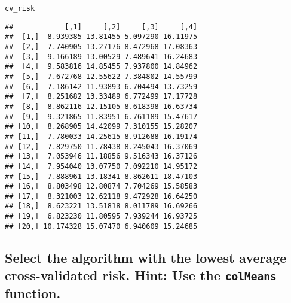\documentclass{article}\usepackage[]{graphicx}\usepackage[]{xcolor}
\makeatletter
\newcommand{\hlstd}[1]{\textcolor[rgb]{0.345,0.345,0.345}{#1}}%
\newenvironment{kframe}{%
 \def\at@end@of@kframe{}%
 \ifinner\ifhmode%
  \def\at@end@of@kframe{\end{minipage}}%
  \begin{minipage}{\columnwidth}%
 \fi\fi%
 \def\FrameCommand##1{\hskip\@totalleftmargin \hskip-\fboxsep
 \colorbox{shadecolor}{##1}\hskip-\fboxsep
     \hskip-\linewidth \hskip-\@totalleftmargin \hskip\columnwidth}%
 \MakeFramed {\advance\hsize-\width
   \@totalleftmargin\z@ \linewidth\hsize
   \@setminipage}}%
 {\par\unskip\endMakeFramed%
 \at@end@of@kframe}
\newenvironment{knitrout}{}{} %
\makeatother
\begin{document}
\begin{knitrout}
\begin{kframe}
\begin{alltt}
\hlstd{cv_risk}
\end{alltt}
\begin{verbatim}
##            [,1]     [,2]     [,3]     [,4]
##  [1,]  8.939385 13.81455 5.097290 16.11975
##  [2,]  7.740905 13.27176 8.472968 17.08363
##  [3,]  9.166189 13.00529 7.489641 16.24683
##  [4,]  9.583816 14.85455 7.937800 14.84962
##  [5,]  7.672768 12.55622 7.384802 14.55799
##  [6,]  7.186142 11.93893 6.704494 13.73259
##  [7,]  8.251682 13.33489 6.772499 17.17728
##  [8,]  8.862116 12.15105 8.618398 16.63734
##  [9,]  9.321865 11.83951 6.761189 15.47617
## [10,]  8.268905 14.42099 7.310155 15.28207
## [11,]  7.780033 14.25615 8.912688 16.19174
## [12,]  7.829750 11.78438 8.245043 16.37069
## [13,]  7.053946 11.18856 9.516343 16.37126
## [14,]  7.954040 13.07750 7.092210 14.95172
## [15,]  7.888961 13.18341 8.862611 18.47103
## [16,]  8.803498 12.80874 7.704269 15.58583
## [17,]  8.321003 12.62118 9.472928 16.64250
## [18,]  8.623221 13.51818 8.011789 16.69266
## [19,]  6.823230 11.80595 7.939244 16.93725
## [20,] 10.174328 15.07470 6.940609 15.24685
\end{verbatim}
\end{kframe}
\end{knitrout}
  
  \subsection{Select the algorithm with the lowest average cross-validated risk. Hint: Use the \texttt{colMeans} function.}
  
\end{document}
